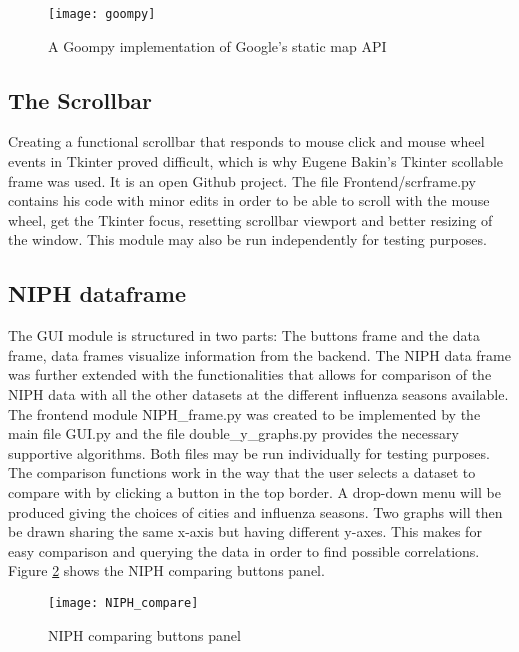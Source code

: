 \begin{figure}[!htb]
\texttt{[image: goompy]}
\centering
\caption{A Goompy implementation of Google's static map API}
\label{fig:the_goompy}
\end{figure}

\newpage














\subsection{The Scrollbar}
Creating a functional scrollbar that responds to mouse click and mouse wheel events in Tkinter proved difficult, which is why Eugene Bakin's Tkinter scollable\cite{scrframe} frame was used. It is an open Github project. The file Frontend/scrframe.py contains his code with minor edits in order to be able to scroll with the mouse wheel, get the Tkinter focus, resetting scrollbar viewport and better resizing of the window. This module may also be run independently for testing purposes.




\subsection{NIPH dataframe}
The GUI module is structured in two parts: The buttons frame and the data frame, data frames visualize information from the backend. The NIPH data frame was further extended with the functionalities that allows for comparison of the NIPH data with all the other datasets at the different influenza seasons available. The frontend module NIPH\_frame.py was created to be implemented by the main file GUI.py and the file double\_y\_graphs.py provides the necessary supportive algorithms. Both files may be run individually for testing purposes. The comparison functions work in the way that the user selects a dataset to compare with by clicking a button in the top border. A drop-down menu will be produced giving the choices of cities and influenza seasons. Two graphs will then be drawn sharing the same x-axis but having different y-axes. This makes for easy comparison and querying the data in order to find possible correlations. Figure \ref{fig:NIPH_compare} shows the NIPH comparing buttons panel.

\begin{figure}[ht]
\texttt{[image: NIPH\_compare]}
\centering
\caption{NIPH comparing buttons panel}
\label{fig:NIPH_compare}
\end{figure}

